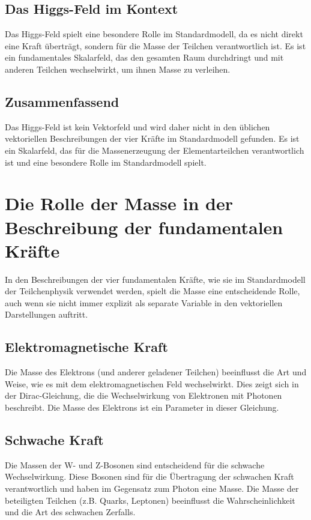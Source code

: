 \documentclass{article}
\begin{document}
\subsection*{Das Higgs-Feld im Kontext}

Das Higgs-Feld spielt eine besondere Rolle im Standardmodell, da es nicht direkt eine Kraft überträgt, sondern für die Masse der Teilchen verantwortlich ist. Es ist ein fundamentales Skalarfeld, das den gesamten Raum durchdringt und mit anderen Teilchen wechselwirkt, um ihnen Masse zu verleihen.

\subsection*{Zusammenfassend}

Das Higgs-Feld ist kein Vektorfeld und wird daher nicht in den üblichen vektoriellen Beschreibungen der vier Kräfte im Standardmodell gefunden. Es ist ein Skalarfeld, das für die Massenerzeugung der Elementarteilchen verantwortlich ist und eine besondere Rolle im Standardmodell spielt.
\section{Die Rolle der Masse in der Beschreibung der fundamentalen Kräfte}

In den Beschreibungen der vier fundamentalen Kräfte, wie sie im Standardmodell der Teilchenphysik verwendet werden, spielt die Masse eine entscheidende Rolle, auch wenn sie nicht immer explizit als separate Variable in den vektoriellen Darstellungen auftritt.

\subsection{Elektromagnetische Kraft}

Die Masse des Elektrons (und anderer geladener Teilchen) beeinflusst die Art und Weise, wie es mit dem elektromagnetischen Feld wechselwirkt. Dies zeigt sich in der Dirac-Gleichung, die die Wechselwirkung von Elektronen mit Photonen beschreibt. Die Masse des Elektrons ist ein Parameter in dieser Gleichung.

\subsection{Schwache Kraft}

Die Massen der W- und Z-Bosonen sind entscheidend für die schwache Wechselwirkung. Diese Bosonen sind für die Übertragung der schwachen Kraft verantwortlich und haben im Gegensatz zum Photon eine Masse. Die Masse der beteiligten Teilchen (z.B. Quarks, Leptonen) beeinflusst die Wahrscheinlichkeit und die Art des schwachen Zerfalls.
\end{document}
